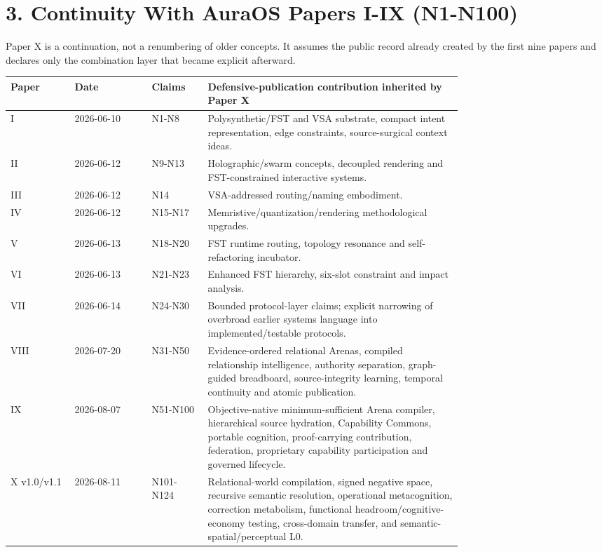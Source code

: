 \documentclass[
  10pt,
  letterpaper,
]{article}
\begin{document}
\section{3. Continuity With AuraOS Papers I-IX
(N1-N100)}\label{3-continuity-with-auraos-papers-i-ix-n1-n100}

Paper X is a continuation, not a renumbering of older concepts. It
assumes the public record already created by the first nine papers and
declares only the combination layer that became explicit afterward.

\begin{longtable}[]{@{}p{0.10\linewidth}p{0.13\linewidth}p{0.09\linewidth}p{0.43\linewidth}@{}}
\toprule\noalign{}
Paper & Date & Claims & Defensive-publication contribution inherited by
Paper X \\
\midrule\noalign{}
\endhead
\bottomrule\noalign{}
\endlastfoot
I & 2026-06-10 & N1-N8 & Polysynthetic/FST and VSA substrate, compact
intent representation, edge constraints, source-surgical context
ideas. \\
II & 2026-06-12 & N9-N13 & Holographic/swarm concepts, decoupled
rendering and FST-constrained interactive systems. \\
III & 2026-06-12 & N14 & VSA-addressed routing/naming embodiment. \\
IV & 2026-06-12 & N15-N17 & Memristive/quantization/rendering
methodological upgrades. \\
V & 2026-06-13 & N18-N20 & FST runtime routing, topology resonance and
self-refactoring incubator. \\
VI & 2026-06-13 & N21-N23 & Enhanced FST hierarchy, six-slot constraint
and impact analysis. \\
VII & 2026-06-14 & N24-N30 & Bounded protocol-layer claims; explicit
narrowing of overbroad earlier systems language into
implemented/testable protocols. \\
VIII & 2026-07-20 & N31-N50 & Evidence-ordered relational Arenas,
compiled relationship intelligence, authority separation, graph-guided
breadboard, source-integrity learning, temporal continuity and atomic
publication. \\
IX & 2026-08-07 & N51-N100 & Objective-native minimum-sufficient Arena
compiler, hierarchical source hydration, Capability Commons, portable
cognition, proof-carrying contribution, federation, proprietary
capability participation and governed lifecycle. \\
X v1.0/v1.1 & 2026-08-11 & N101-N124 & Relational-world compilation,
signed negative space, recursive semantic resolution, operational
metacognition, correction metabolism, functional
headroom/cognitive-economy testing, cross-domain transfer, and
semantic-spatial/perceptual L0. \\
\end{longtable}
\end{document}
